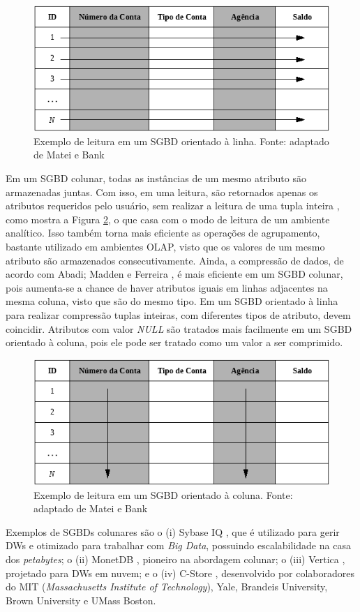 \begin{figure}[h]
	\centering
		\includegraphics[width=12cm]{img/bd_linha}
	\caption{Exemplo de leitura em um SGBD orientado à linha. Fonte: adaptado de Matei e Bank \cite{matei2010column}}
	\label{fig:sgbd_linha}
\end{figure}

Em um SGBD colunar, todas as instâncias de um mesmo atributo são armazenadas juntas. Com isso, em uma leitura, são retornados apenas os atributos requeridos pelo usuário, sem realizar a leitura de uma tupla inteira \cite{khoshafian1987query}, como mostra a Figura \ref{fig:sgbd_col}, o que casa com o modo de leitura de um ambiente analítico. Isso também torna mais eficiente as operações de agrupamento, bastante utilizado em ambientes OLAP, visto que os valores de um mesmo atributo são armazenados consecutivamente. Ainda, a compressão de dados, de acordo com Abadi; Madden e Ferreira \cite{abadi2006integrating}, é mais eficiente em um SGBD colunar, pois aumenta-se a chance de haver atributos iguais em linhas adjacentes na mesma coluna, visto que são do mesmo tipo. Em um SGBD orientado à linha para realizar compressão tuplas inteiras, com diferentes tipos de atributo, devem coincidir. Atributos com valor \textit{NULL} são tratados mais facilmente em um SGBD orientado à coluna, pois ele pode ser tratado como um valor a ser comprimido.

\begin{figure}[h]
	\centering
		\includegraphics[width=12cm]{img/bd_colunar.png}
	\caption{Exemplo de leitura em um SGBD orientado à coluna. Fonte: adaptado de Matei e Bank \cite{matei2010column}}
	\label{fig:sgbd_col}
\end{figure}

Exemplos de SGBDs colunares são o (i) Sybase IQ \cite{macnicol2004sybase}, que é utilizado para gerir DWs e otimizado para trabalhar com \textit{Big Data}, possuindo escalabilidade na casa dos \textit{petabytes}; o (ii) MonetDB \cite{monetdb2017c}, pioneiro na abordagem colunar; o (iii) Vertica \cite{vertica2017c}, projetado para DWs em nuvem; e o (iv) C-Store \cite{stonebraker2005c}, desenvolvido por colaboradores do MIT (\textit{Massachusetts Institute of Technology}), Yale, Brandeis University, Brown University e UMass Boston.
